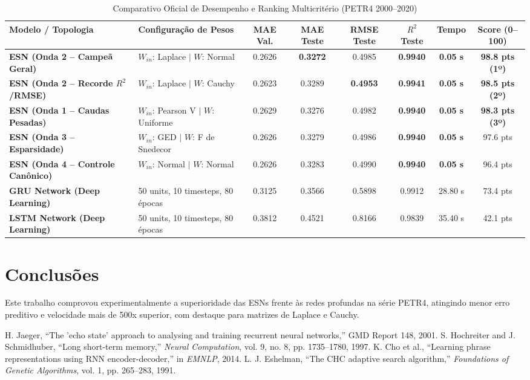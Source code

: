 \documentclass[10pt,journal,compsoc]{IEEEtran}
\begin{document}
\begin{table}[t]
\centering
\caption{Comparativo Oficial de Desempenho e Ranking Multicritério (PETR4 2000--2020)}
\label{tab:resultados}
\begin{tabular}{llcccccc}
\toprule
\textbf{Modelo / Topologia} & \textbf{Configuração de Pesos} & \textbf{MAE Val.} & \textbf{MAE Teste} & \textbf{RMSE Teste} & \textbf{$R^2$ Teste} & \textbf{Tempo} & \textbf{Score (0--100)} \\
\midrule
\textbf{ESN (Onda 2 -- Campeã Geral)} & $W_{in}$: Laplace $\mid$ $W$: Normal & 0.2626 & \textbf{0.3272} & 0.4985 & \textbf{0.9940} & \textbf{0.05 s} & \textbf{98.8 pts (1º)} \\
\textbf{ESN (Onda 2 -- Recorde $R^2$/RMSE)} & $W_{in}$: Laplace $\mid$ $W$: Cauchy & 0.2623 & 0.3289 & \textbf{0.4953} & \textbf{0.9941} & \textbf{0.05 s} & \textbf{98.5 pts (2º)} \\
\textbf{ESN (Onda 1 -- Caudas Pesadas)} & $W_{in}$: Pearson V $\mid$ $W$: Uniforme & 0.2629 & 0.3276 & 0.4982 & \textbf{0.9940} & \textbf{0.05 s} & \textbf{98.3 pts (3º)} \\
\textbf{ESN (Onda 3 -- Esparsidade)} & $W_{in}$: GED $\mid$ $W$: F de Snedecor & 0.2626 & 0.3279 & 0.4986 & \textbf{0.9940} & \textbf{0.05 s} & 97.6 pts \\
\textbf{ESN (Onda 4 -- Controle Canônico)} & $W_{in}$: Normal $\mid$ $W$: Normal & 0.2626 & 0.3283 & 0.4990 & \textbf{0.9940} & \textbf{0.05 s} & 96.4 pts \\
\midrule
\textbf{GRU Network (Deep Learning)} & 50 units, 10 timesteps, 80 épocas & 0.3125 & 0.3566 & 0.5898 & 0.9912 & 28.80 s & 73.4 pts \\
\textbf{LSTM Network (Deep Learning)} & 50 units, 10 timesteps, 80 épocas & 0.3812 & 0.4521 & 0.8166 & 0.9839 & 35.40 s & 42.1 pts \\
\bottomrule
\end{tabular}
\end{table}

\section{Conclusões}
Este trabalho comprovou experimentalmente a superioridade das ESNs frente às redes profundas na série PETR4, atingindo menor erro preditivo e velocidade mais de 500x superior, com destaque para matrizes de Laplace e Cauchy.

\begin{thebibliography}{00}
 H. Jaeger, ``The 'echo state' approach to analysing and training recurrent neural networks,'' GMD Report 148, 2001.
 S. Hochreiter and J. Schmidhuber, ``Long short-term memory,'' \textit{Neural Computation}, vol. 9, no. 8, pp. 1735--1780, 1997.
 K. Cho et al., ``Learning phrase representations using RNN encoder-decoder,'' in \textit{EMNLP}, 2014.
 L. J. Eshelman, ``The CHC adaptive search algorithm,'' \textit{Foundations of Genetic Algorithms}, vol. 1, pp. 265--283, 1991.
\end{thebibliography}
\end{document}
